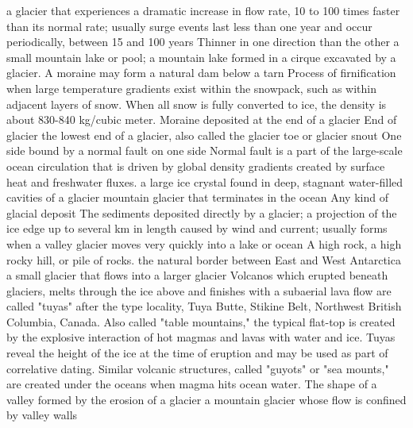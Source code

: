  a glacier that experiences a dramatic increase in flow rate, 10 to 100 times faster than its normal rate; usually surge events last less than one year and occur periodically, between 15 and 100 years
 Thinner in one direction than the other
 a small mountain lake or pool; a mountain lake formed in a cirque excavated by a glacier. A moraine may form a natural dam below a tarn
 Process of firnification when large temperature gradients exist within the snowpack, such as within adjacent layers of snow. When all snow is fully converted to ice, the density is about 830-840 kg/cubic meter.
 Moraine deposited at the end of a glacier
 End of glacier
 the lowest end of a glacier, also called the glacier toe or glacier snout
 One side bound by a normal fault on one side
 Normal fault
 is a part of the large-scale ocean circulation that is driven by global density gradients created by surface heat and freshwater fluxes.
 a large ice crystal found in deep, stagnant water-filled cavities of a glacier
 mountain glacier that terminates in the ocean
 Any kind of glacial deposit
 The sediments deposited directly by a glacier;
 a projection of the ice edge up to several km in length caused by wind and current; usually forms when a valley glacier moves very quickly into a lake or ocean
 A high rock, a high rocky hill, or pile of rocks.
 the natural border between East and West Antarctica
 a small glacier that flows into a larger glacier
 Volcanos which erupted beneath glaciers, melts through the ice above and finishes with a subaerial lava flow are called "tuyas" after the type locality, Tuya Butte, Stikine Belt, Northwest British Columbia, Canada. Also called "table mountains," the typical flat-top is created by the explosive interaction of hot magmas and lavas with water and ice. Tuyas reveal the height of the ice at the time of eruption and may be used as part of correlative dating. Similar volcanic structures, called "guyots" or "sea mounts," are created under the oceans when magma hits ocean water.
 The shape of a valley formed by the erosion of a glacier
 a mountain glacier whose flow is confined by valley walls
